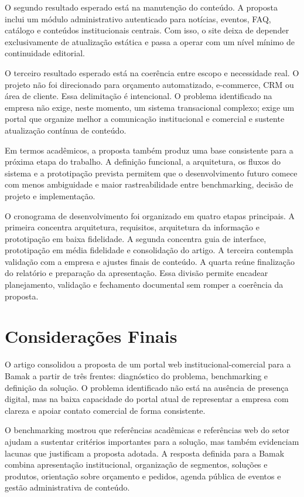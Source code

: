 \documentclass[portuguese]{sbcreviews-2025}
\begin{document}
O segundo resultado esperado está na manutenção do conteúdo. A proposta inclui um módulo administrativo autenticado para notícias, eventos, FAQ, catálogo e conteúdos institucionais centrais. Com isso, o site deixa de depender exclusivamente de atualização estática e passa a operar com um nível mínimo de continuidade editorial.

O terceiro resultado esperado está na coerência entre escopo e necessidade real. O projeto não foi direcionado para orçamento automatizado, e-commerce, CRM ou área de cliente. Essa delimitação é intencional. O problema identificado na empresa não exige, neste momento, um sistema transacional complexo; exige um portal que organize melhor a comunicação institucional e comercial e sustente atualização contínua de conteúdo.

Em termos acadêmicos, a proposta também produz uma base consistente para a próxima etapa do trabalho. A definição funcional, a arquitetura, os fluxos do sistema e a prototipação prevista permitem que o desenvolvimento futuro comece com menos ambiguidade e maior rastreabilidade entre benchmarking, decisão de projeto e implementação.

O cronograma de desenvolvimento foi organizado em quatro etapas principais. A primeira concentra arquitetura, requisitos, arquitetura da informação e prototipação em baixa fidelidade. A segunda concentra guia de interface, prototipação em média fidelidade e consolidação do artigo. A terceira contempla validação com a empresa e ajustes finais de conteúdo. A quarta reúne finalização do relatório e preparação da apresentação. Essa divisão permite encadear planejamento, validação e fechamento documental sem romper a coerência da proposta.

\section{Considerações Finais}

O artigo consolidou a proposta de um portal web institucional-comercial para a Bamak a partir de três frentes: diagnóstico do problema, benchmarking e definição da solução. O problema identificado não está na ausência de presença digital, mas na baixa capacidade do portal atual de representar a empresa com clareza e apoiar contato comercial de forma consistente.

O benchmarking mostrou que referências acadêmicas e referências web do setor ajudam a sustentar critérios importantes para a solução, mas também evidenciam lacunas que justificam a proposta adotada. A resposta definida para a Bamak combina apresentação institucional, organização de segmentos, soluções e produtos, orientação sobre orçamento e pedidos, agenda pública de eventos e gestão administrativa de conteúdo.
\end{document}
